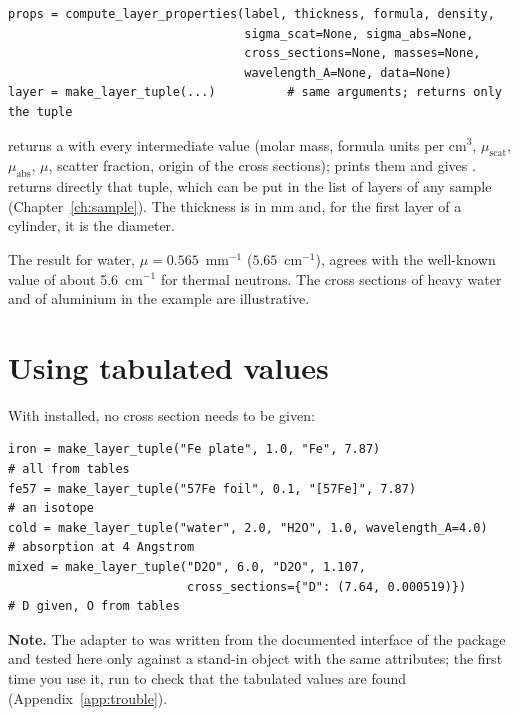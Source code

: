\begin{lstlisting}
props = compute_layer_properties(label, thickness, formula, density,
                                 sigma_scat=None, sigma_abs=None,
                                 cross_sections=None, masses=None,
                                 wavelength_A=None, data=None)
layer = make_layer_tuple(...)          # same arguments; returns only the tuple
\end{lstlisting}
 returns a  with every intermediate value (molar mass, formula units per cm$^3$, $\mu_\mathrm{scat}$,
$\mu_\mathrm{abs}$, $\mu$, scatter fraction, origin of the cross sections);  prints them and  gives
.  returns directly that tuple, which can be put in the list of layers of any sample
(Chapter~\ref{ch:sample}). The thickness is in mm and, for the first layer of a cylinder, it is the diameter.


The result for water, $\mu=0.565$~mm$^{-1}$ ($5.65$~cm$^{-1}$), agrees with the well-known value of about 5.6~cm$^{-1}$ for thermal neutrons.
The cross sections of heavy water and of aluminium in the example are illustrative.

\section{Using tabulated values}

With  installed, no cross section needs to be given:
\begin{lstlisting}
iron = make_layer_tuple("Fe plate", 1.0, "Fe", 7.87)                    # all from tables
fe57 = make_layer_tuple("57Fe foil", 0.1, "[57Fe]", 7.87)               # an isotope
cold = make_layer_tuple("water", 2.0, "H2O", 1.0, wavelength_A=4.0)     # absorption at 4 Angstrom
mixed = make_layer_tuple("D2O", 6.0, "D2O", 1.107,
                         cross_sections={"D": (7.64, 0.000519)})        # D given, O from tables
\end{lstlisting}
\textbf{Note.} The adapter to  was written from the documented interface of the package and tested here only against a stand-in object with the
same attributes; the first time you use it, run  to check that the tabulated values are found (Appendix~\ref{app:trouble}).
